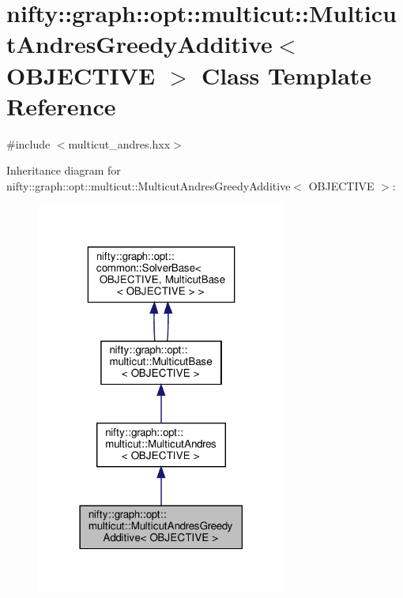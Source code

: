 \hypertarget{classnifty_1_1graph_1_1opt_1_1multicut_1_1MulticutAndresGreedyAdditive}{}\section{nifty\+:\+:graph\+:\+:opt\+:\+:multicut\+:\+:Multicut\+Andres\+Greedy\+Additive$<$ O\+B\+J\+E\+C\+T\+I\+VE $>$ Class Template Reference}
\label{classnifty_1_1graph_1_1opt_1_1multicut_1_1MulticutAndresGreedyAdditive}


{\ttfamily \#include $<$multicut\+\_\+andres.\+hxx$>$}



Inheritance diagram for nifty\+:\+:graph\+:\+:opt\+:\+:multicut\+:\+:Multicut\+Andres\+Greedy\+Additive$<$ O\+B\+J\+E\+C\+T\+I\+VE $>$\+:
\nopagebreak
\begin{figure}[H]
\begin{center}
\leavevmode
\includegraphics[width=234pt]{classnifty_1_1graph_1_1opt_1_1multicut_1_1MulticutAndresGreedyAdditive__inherit__graph}
\end{center}
\end{figure}


